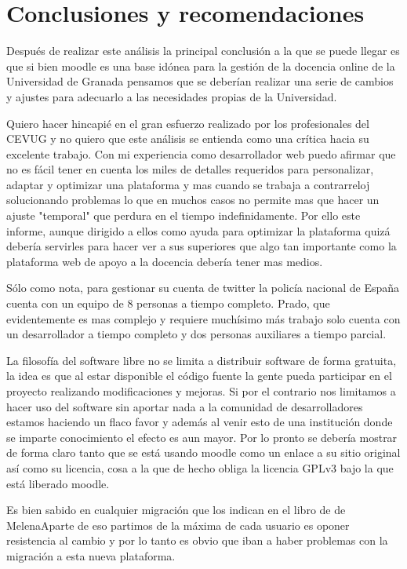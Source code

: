 \chapter{Conclusiones y recomendaciones}

Después de realizar este análisis la principal conclusión a la que se puede llegar es que si bien moodle es una base idónea para la gestión de la docencia online de la Universidad de Granada pensamos que se deberían realizar una serie de cambios y ajustes para adecuarlo a las necesidades propias de la Universidad.

\bigskip
Quiero hacer hincapié en el gran esfuerzo realizado por los profesionales del CEVUG y no quiero que este análisis se entienda como una crítica hacia su excelente trabajo. Con mi experiencia como desarrollador web puedo afirmar que no es fácil tener en cuenta los miles de detalles requeridos para personalizar, adaptar y optimizar una plataforma y mas cuando se trabaja a contrarreloj solucionando problemas lo que en muchos casos no permite mas que hacer un ajuste "temporal" que perdura en el tiempo indefinidamente. Por ello este informe, aunque dirigido a ellos como ayuda para optimizar la plataforma quizá debería servirles para hacer ver a sus superiores que algo tan importante como la plataforma web de apoyo a la docencia debería tener mas medios.

\bigskip
Sólo como nota, para gestionar su cuenta de twitter la policía nacional de España cuenta con un equipo de 8 personas a tiempo completo. Prado, que evidentemente es mas complejo y requiere muchísimo más trabajo solo cuenta con un desarrollador a tiempo completo y dos personas auxiliares a tiempo parcial.

\bigskip

La filosofía del software libre no se limita a distribuir software de forma gratuita, la idea es que al estar disponible el código fuente la gente pueda participar en el proyecto realizando modificaciones y mejoras. Si por el contrario nos limitamos a hacer uso del software sin aportar nada a la comunidad de desarrolladores estamos haciendo un flaco favor y además al venir esto de una institución donde se imparte conocimiento el efecto es aun mayor. Por lo pronto se debería mostrar de forma claro tanto que se está usando moodle como un enlace a su sitio original así como su licencia, cosa a la que de hecho obliga la licencia GPLv3 bajo la que está liberado moodle.

\bigskip

Es bien sabido en cualquier migración que los  indican en el libro de de MelenaAparte de eso partimos de la máxima de cada usuario es oponer resistencia al cambio y por lo tanto es obvio que iban a haber problemas con la migración a esta nueva plataforma.

